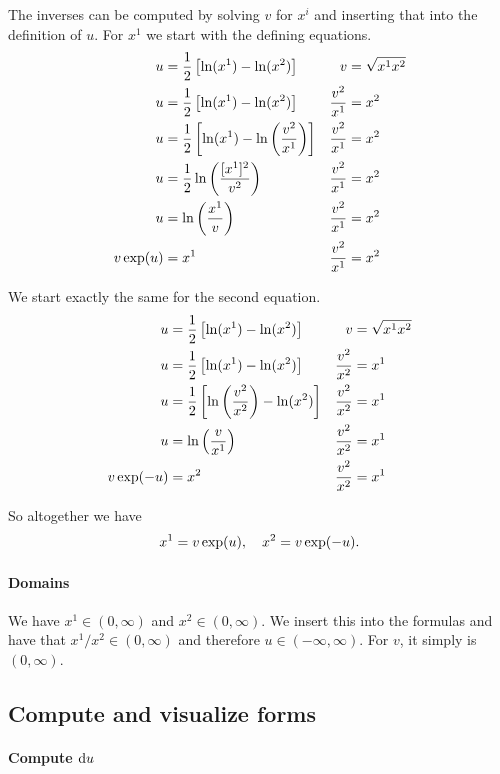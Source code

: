\documentclass[11pt, english, fleqn, DIV=15, headinclude, BCOR=1cm]{scrartcl}
\begin{document}
The inverses can be computed by solving $v$ for $x^i$ and inserting that into
the definition of $u$. For $x^1$ we start with the defining equations.
\begin{align*}
    u &= \frac12 \left[ \ln(x^1) - \ln(x^2) \right]
    &
    v &= \sqrt{x^1 x^2} \\
    u &= \frac12 \left[ \ln(x^1) - \ln(x^2) \right]
    &
    \frac{v^2}{x^1} &= x^2 \\
    u &= \frac12 \left[ \ln(x^1) - \ln\left( \frac{v^2}{x^1} \right) \right]
    &
    \frac{v^2}{x^1} &= x^2 \\
    u &= \frac12 \ln\left( \frac{[x^1]^2}{v^2} \right)
    &
    \frac{v^2}{x^1} &= x^2 \\
    u &= \ln\left( \frac{x^1}{v} \right)
    &
    \frac{v^2}{x^1} &= x^2 \\
    v \exp(u) &= x^1
    &
    \frac{v^2}{x^1} &= x^2
\end{align*}

We start exactly the same for the second equation.
\begin{align*}
    u &= \frac12 \left[ \ln(x^1) - \ln(x^2) \right]
    &
    v &= \sqrt{x^1 x^2} \\
    u &= \frac12 \left[ \ln(x^1) - \ln(x^2) \right]
    &
    \frac{v^2}{x^2} &= x^1 \\
    u &= \frac12 \left[ \ln\left( \frac{v^2}{x^2} \right) - \ln(x^2) \right]
    &
    \frac{v^2}{x^2} &= x^1 \\
    u &= \ln\left( \frac{v}{x^1} \right)
    &
    \frac{v^2}{x^2} &= x^1 \\
    v \exp(-u) &= x^2
    &
    \frac{v^2}{x^2} &= x^1
\end{align*}

So altogether we have
\[
    x^1 = v \exp(u)
    ,\quad
    x^2 = v \exp(-u).
\]

\paragraph{Domains}

We have $x^1 \in (0, \infty)$ and $x^2 \in (0, \infty)$. We insert this into the
formulas and have that $x^1/x^2 \in (0, \infty)$ and therefore $u \in (-\infty,
\infty)$. For $v$, it simply is $(0, \infty)$.

\subsection{Compute and visualize forms}

\paragraph{Compute $\mathop{}\!\mathrm d u$}
\end{document}
